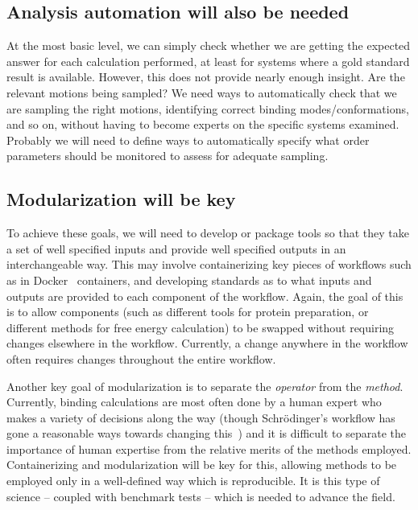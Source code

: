 \documentclass[aps,pre,twocolumn,nofootinbib,superscriptaddress,10pt, final,tightenlines]{revtex4-1}
\begin{document}
\subsection{Analysis automation will also be needed}
At the most basic level, we can simply check whether we are getting the expected answer for each calculation performed, at least for systems where a gold standard result is available. 
However, this does not provide nearly enough insight.  
Are the relevant motions being sampled? 
We need ways to automatically check that we are sampling the right motions, identifying correct binding modes/conformations, and so on, without having to become experts on the specific systems examined. 
Probably we will need to define ways to automatically specify what order parameters should be monitored to assess for adequate sampling. 

\subsection{Modularization will be key}
To achieve these goals, we will need to develop or package tools so that they take a set of well specified inputs and provide well specified outputs in an interchangeable way. 
This may involve containerizing key pieces of workflows such as in Docker~\cite{docker_what_2015} containers, and developing standards as to what inputs and outputs are provided to each component of the workflow. 
Again, the goal of this is to allow components (such as different tools for protein preparation, or different methods for free energy calculation) to be swapped without requiring changes elsewhere in the workflow. Currently, a change anywhere in the workflow often requires changes throughout the entire workflow.

Another key goal of modularization is to separate the \emph{operator} from the \emph{method}. 
Currently, binding calculations are most often done by a human expert who makes a variety of decisions along the way (though Schr\"odinger's workflow has gone a reasonable ways towards changing this~\cite{schrodinger_accurate_2015}) and it is difficult to separate the importance of human expertise from the relative merits of the methods employed. 
Containerizing and modularization will be key for this, allowing methods to be employed only in a well-defined way which is reproducible. It is this type of science -- coupled with benchmark tests -- which is needed to advance the field.
\end{document}
